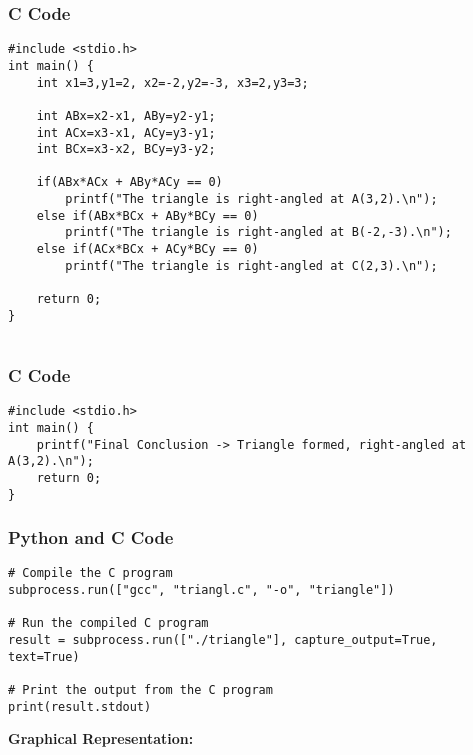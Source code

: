 \documentclass{beamer}
\begin{document}
\begin{frame}[fragile]
\frametitle{C Code}
\begin{lstlisting}
#include <stdio.h>
int main() {
    int x1=3,y1=2, x2=-2,y2=-3, x3=2,y3=3;

    int ABx=x2-x1, ABy=y2-y1;
    int ACx=x3-x1, ACy=y3-y1;
    int BCx=x3-x2, BCy=y3-y2;

    if(ABx*ACx + ABy*ACy == 0)
        printf("The triangle is right-angled at A(3,2).\n");
    else if(ABx*BCx + ABy*BCy == 0)
        printf("The triangle is right-angled at B(-2,-3).\n");
    else if(ACx*BCx + ACy*BCy == 0)
        printf("The triangle is right-angled at C(2,3).\n");

    return 0;
}


\end{lstlisting}

\end{frame}

\begin{frame}[fragile]
\frametitle{C Code}
\begin{lstlisting}
#include <stdio.h>
int main() {
    printf("Final Conclusion -> Triangle formed, right-angled at A(3,2).\n");
    return 0;
}

\end{lstlisting}

\end{frame}



    \begin{frame}[fragile]
\frametitle{Python and C Code}

\begin{lstlisting}
# Compile the C program
subprocess.run(["gcc", "triangl.c", "-o", "triangle"])

# Run the compiled C program
result = subprocess.run(["./triangle"], capture_output=True, text=True)

# Print the output from the C program 
print(result.stdout)
\end{lstlisting}

\end{frame}

\textbf{Graphical Representation:}
\end{document}
